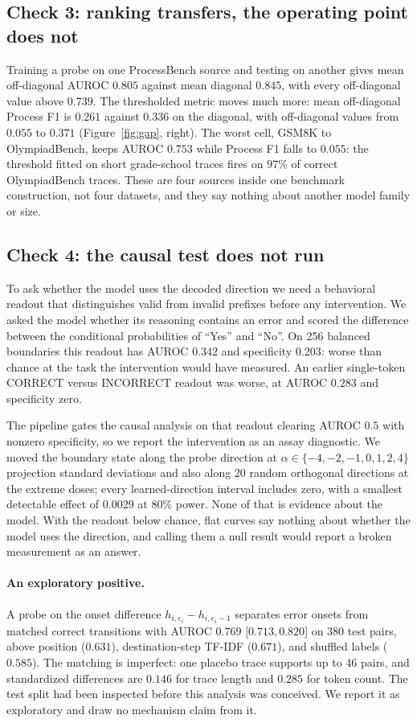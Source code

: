 \documentclass{article}
\newcommand{\dataset}{ProcessBench}
\begin{document}
\subsection{Check 3: ranking transfers, the operating point does not}

Training a probe on one \dataset{} source and testing on another gives mean off-diagonal AUROC
$0.805$ against mean diagonal $0.845$, with every off-diagonal value above $0.739$. The thresholded
metric moves much more: mean off-diagonal Process F1 is $0.261$ against $0.336$ on the diagonal,
with off-diagonal values from $0.055$ to $0.371$ (Figure~\ref{fig:gap}, right). The worst cell,
GSM8K to OlympiadBench, keeps AUROC $0.753$ while Process F1 falls to $0.055$: the threshold fitted
on short grade-school traces fires on $97\%$ of correct OlympiadBench traces. These
are four sources inside one benchmark construction, not four datasets, and they say nothing about
another model family or size.

\subsection{Check 4: the causal test does not run}

To ask whether the model uses the decoded direction we need a behavioral readout that distinguishes
valid from invalid prefixes before any intervention. We asked the model whether its reasoning
contains an error and scored the difference between the conditional probabilities of ``Yes'' and
``No''. On 256 balanced boundaries this readout has AUROC $0.342$ and specificity $0.203$: worse
than chance at the task the intervention would have measured. An earlier single-token CORRECT
versus INCORRECT readout was worse, at AUROC $0.283$ and specificity zero.

The pipeline gates the causal analysis on that readout clearing AUROC $0.5$ with nonzero
specificity, so we report the intervention as an assay diagnostic. We moved the boundary state
along the probe direction at $\alpha\in\{-4,-2,-1,0,1,2,4\}$ projection standard deviations and
also along 20 random orthogonal directions at the extreme doses; every learned-direction interval
includes zero, with a smallest detectable effect of $0.0029$ at 80\% power. None of that is
evidence about the model. With the readout below chance, flat curves say nothing about whether the
model uses the direction, and calling them a null result would report a broken measurement as an
answer.

\paragraph{An exploratory positive.}
A probe on the onset difference $h_{i,e_i}-h_{i,e_i-1}$ separates error onsets from matched correct
transitions with AUROC $0.769$ [$0.713,0.820$] on 380 test pairs, above position ($0.631$),
destination-step TF-IDF ($0.671$), and shuffled labels ($0.585$). The matching is imperfect: one
placebo trace supports up to 46 pairs, and standardized differences are $0.146$ for trace length
and $0.285$ for token count. The test split had been inspected before this analysis was conceived.
We report it as exploratory and draw no mechanism claim from it.
\end{document}
